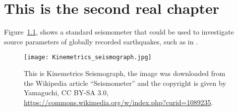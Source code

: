 \chapter{This is the second real chapter}
\graphicspath{{\currfiledir/figures/}}

\lipsum[5-6]

Figure~\ref{fig:seismometer}, shows a standard seismometer that could be used to investigate source parameters of globally recorded earthquakes, such as in \cite{Dziewonski1983}.


\begin{figure}
	\texttt{[image: Kinemetrics\_seismograph.jpg]}
	\caption{This is Kinemetrics Seismograph, the image was downloaded from the Wikipedia article ``Seismometer'' and the copyright is given by Yamaguchi, CC BY-SA 3.0, \url{https://commons.wikimedia.org/w/index.php?curid=1089235}.}
	\label{fig:seismometer}
\end{figure}

\lipsum[7-8]





